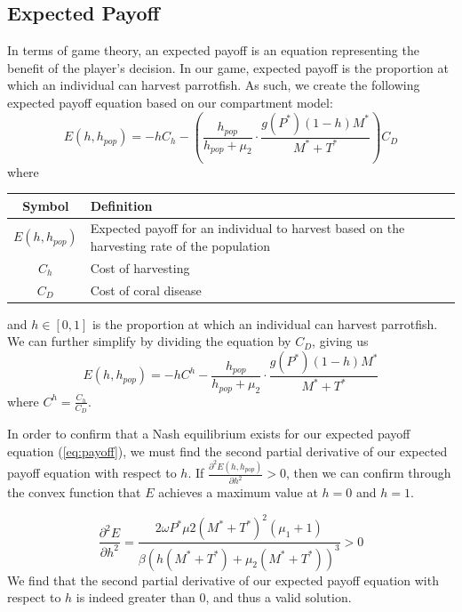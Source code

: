 \documentclass[12pt]{article}
\begin{document}
\subsection{Expected Payoff}
In terms of game theory, an expected payoff is an equation representing the benefit of the player's decision. In our game, expected payoff is the proportion at which an individual can harvest parrotfish. As such, we create the following expected payoff equation based on our compartment model:
\begin{equation*}\label{eq:initial_payoff}
    \displaystyle {E(h, h_{pop}) = -hC_{h} - \left( \frac{h_{pop}}{h_{pop} + \mu_{2}} \cdot \frac{g(P^{*})(1-h)M^{*}}{M^{*} + T^{*}} \right) C_{D}}
\end{equation*}
where
\begin{table}[H]
    \centering
    \begin{tabular}{c|p{9cm}}
         Symbol & Definition \\
         \hline
         $E(h, h_{pop})$ & Expected payoff for an individual to harvest based on the harvesting rate of the population \\
         $C_{h}$ & Cost of harvesting \\
         $C_{D}$ & Cost of coral disease \\
    \end{tabular}
    \label{tab:payoff_eq_params}
\end{table}
and $h \in [0,1]$ is the proportion at which an individual can harvest
parrotfish. \\
We can further simplify by dividing the equation by $C_{D}$, giving us 
\begin{equation*}\label{eq:payoff}
    \displaystyle {E(h, h_{pop}) = -hC^{h} - \frac{h_{pop}}{h_{pop} + \mu_{2}} \cdot \frac{g(P^{*})(1-h)M^{*}}{M^{*} + T^{*}}}
\end{equation*}
where $C^{h} = \frac{C_{h}}{C_{D}}$. \\ \par
In order to confirm that a Nash equilibrium exists for our expected payoff equation (\ref{eq:payoff}), we must find the second partial derivative of our expected payoff equation with respect to $h$. If $\frac{\partial^{2}E(h, h_{pop})}{\partial h^{2}} > 0$, then we can confirm through the convex function that $E$ achieves a maximum value at $h=0$ and $h=1$. \par
\begin{equation*}\label{eq:nash_partial_deriv}
    \displaystyle {\frac{\partial ^ {2} E}{\partial h^{2}} = \frac{2 \omega P^{*} \mu{2} (M^{*}+T^{*})^{2} (\mu_{1} +1)}{\beta(h(M^{*}+T^{*}) + \mu_{2}(M^{*}+T^{*}))^{3}} > 0}
\end{equation*}
We find that the second partial derivative of our expected payoff equation with respect to $h$ is indeed greater than 0, and thus a valid solution.
\end{document}
